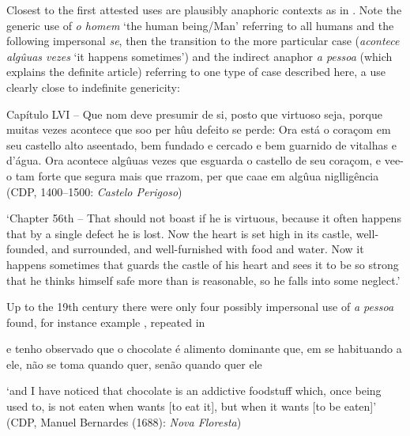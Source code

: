 \documentclass[output=paper]{langscibook}
\begin{document}
Closest to the first attested uses are plausibly anaphoric contexts as in . Note the generic use of {\textit{o homem}} {‘the human being/Man’ referring to all humans and the following impersonal} {\textit{se}}{, then the transition to the more particular case (}{\textit{acontece algûuas vezes} }{‘it happens sometimes’) and the indirect anaphor} {\textit{a pessoa} }{(which explains the definite article) referring to one type of case described here, a use clearly close to indefinite genericity:}



\eanoraggedright\label{ex:amaral:22}
\begin{otherlanguage}{portuguese}
Capítulo LVI – Que  nom deve presumir de si, posto que virtuoso seja, porque muitas vezes acontece que soo per hûu defeito se perde: Ora está o coraçom em seu castello alto aseentado, bem fundado e cercado e bem guarnido de vitalhas e d’água. Ora acontece algûuas vezes que    esguarda o castello de seu coraçom, e vee-o tam forte que  segura mais que rrazom, per que caae em algûua niglligência (CDP, 1400–1500: \textit{Castelo Perigoso})
\end{otherlanguage}
\glt ‘Chapter 56th – That {} {should not boast if he is virtuous, because it often happens that by a single defect he is lost. Now the heart is set high in its castle, well{}-founded, and surrounded, and well{}-furnished with food and water. Now it happens sometimes that} { } {guards the castle of his heart and sees it to be so strong that he thinks himself safe more than is reasonable, so he falls into some neglect.’}
\z 


Up to the 19th century there were only four  possibly impersonal use of \textit{a pessoa} found, for instance example , repeated in 



\eanoraggedright\label{ex:amaral:23}
\begin{otherlanguage}{portuguese}
e tenho observado que o chocolate é alimento dominante que, em se habituando a ele, não se toma quando  quer, senão quando quer ele 
\end{otherlanguage}
\glt ‘and I have noticed that chocolate is an addictive foodstuff which, once being used to, is not eaten when { } {wants [to eat it], but when it wants [to be eaten]’ (CDP, Manuel Bernardes (1688):} {\textit{Nova Floresta}}) 
\z 
\end{document}
